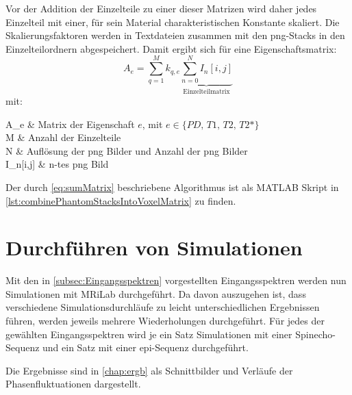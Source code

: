 Vor der Addition der Einzelteile zu einer dieser Matrizen wird daher jedes Einzelteil mit einer, für sein Material charakteristischen Konstante skaliert. Die Skalierungsfaktoren werden in Textdateien zusammen mit den png-Stacks in den Einzelteilordnern abgespeichert. Damit ergibt sich für eine Eigenschaftsmatrix:
\begin{equation}
\label{eq:sumMatrix}
	A_e=\sum_{q=1}^{M} k_{q,e} \underbrace{\sum_{n=0}^{N} I_n[i,j]}_\text{Einzelteilmatrix}
\end{equation}
mit:
\begin{with*}
	A_e & Matrix der Eigenschaft $e$, mit $e \in \{PD,\, T1,\, T2,\, T2\text{*}\}$ \\
	M & Anzahl der Einzelteile \\
	N & Auflösung der png Bilder und Anzahl der png Bilder \\
	I_n[i,j] & n-tes png Bild \\
\end{with*}

Der durch \autoref{eq:sumMatrix} beschriebene Algorithmus ist als MATLAB Skript in \autoref{lst:combinePhantomStacksIntoVoxelMatrix} zu finden.

\section{Durchführen von Simulationen}
Mit den in \autoref{subsec:Eingangsspektren} vorgestellten Eingangsspektren werden nun Simulationen mit MRiLab durchgeführt. Da davon auszugehen ist, dass verschiedene Simulationsdurchläufe zu leicht unterschiedlichen Ergebnissen führen, werden jeweils mehrere Wiederholungen durchgeführt. Für jedes der gewählten Eingangsspektren wird je ein Satz Simulationen mit einer Spinecho-Sequenz und ein Satz mit einer \gls{epi}-Sequenz durchgeführt.

Die Ergebnisse sind in \autoref{chap:ergb} als Schnittbilder und Verläufe der Phasenfluktuationen dargestellt.










